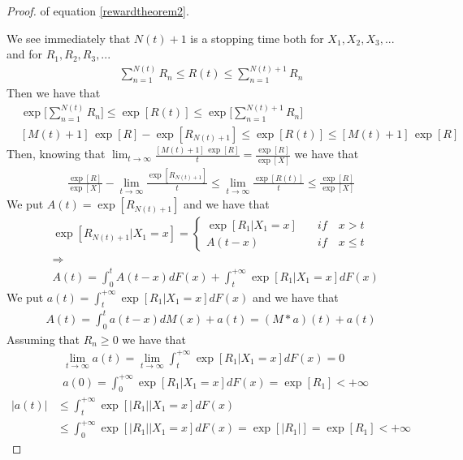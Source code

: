\begin{proof} of equation \ref{rewardtheorem2}.

	We see immediately that $N(t)+1$ is a stopping time both for $X_1,X_2,X_3,...$ and for $R_1,R_2,R_3,..$.
	\begin{align*}
		\sum_{n=1}^{N(t)}R_n \leq R(t) \leq \sum_{n=1}^{N(t)+1}R_n
	\end{align*}
	Then we have that
	\begin{align*}
		& \exp\bigg[\sum_{n=1}^{N(t)}R_n\bigg] \leq \exp[R(t)] \leq \exp\bigg[\sum_{n=1}^{N(t)+1}R_n\bigg]
		\\ & [M(t)+1] \, \exp[R]-\exp[R_{N(t)+1}] \leq \exp[R(t)] \leq [M(t)+1] \, \exp[R]
	\end{align*}
	Then, knowing that $\lim_{t \to \infty} \frac{[M(t)+1] \, \exp[R]}{t} = \frac {\exp[R]}{\exp[X]} $ we have that
	\begin{align*}
		\frac {\exp[R]}{\exp[X]} - \lim_{t \to \infty} \frac{\exp[R_{N(t)+1}]}{t} \leq \lim_{t \to \infty} \frac{\exp[R(t)]}{t} \leq \frac{\exp[R]}{\exp[X]}
	\end{align*}
	We put $A(t)=\exp[R_{N(t)+1}]$ and we have that
	\begin{align*}
		& \exp[R_{N(t)+1}|X_1=x]=
			\begin{cases}
				\exp[R_1|X_1=x] \quad & if \quad x>t
				\\ A(t-x) \quad & if \quad x \leq t
			\end{cases}
		\\ & \Rightarrow
		\\ & A(t)=\int_{0}^{t}A(t-x)dF(x)+\int_{t}^{+\infty}\exp[R_1|X_1=x]dF(x)
	\end{align*}
	We put $a(t)=\int_{t}^{+\infty}\exp[R_1|X_1=x]dF(x)$ and we have that
	\begin{align*}
		A(t)=\int_{0}^{t}a(t-x)dM(x)+a(t)=(M \ast a) (t)+a(t)
	\end{align*}
	Assuming that $R_n \geq 0$ we have that
	\begin{align*}
		& \lim_{t \to \infty}a(t) = \lim_{t \to \infty}\int_{t}^{+\infty}\exp[R_1|X_1=x]dF(x)=0
		\\ & a(0)=\int_{0}^{+\infty}\exp[R_1|X_1=x]dF(x)=\exp[R_1]<+\infty
	\end{align*}
	\begin{align*}
		|a(t)| & \leq \int_{t}^{+\infty}\exp[|R_1||X_1=x]dF(x)
		\\ & \leq \int_{0}^{+\infty}\exp[|R_1||X_1=x]dF(x) = \exp[|R_1|]=\exp[R_1]<+\infty
	\end{align*}

\end{proof}
